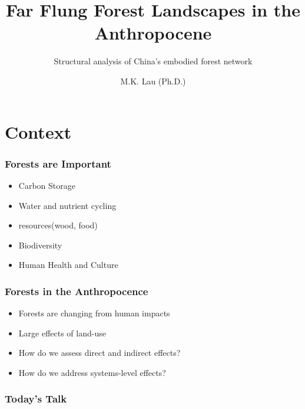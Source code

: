 \documentclass[aspectratio=169]{beamer}
\title{Far Flung Forest Landscapes in the Anthropocene}
\subtitle{Structural analysis of China's embodied forest network}
\author{M.K. Lau (Ph.D.)}
\institute{Chinese Academy of Sciences and Harvard University}
\begin{document}
\begin{frame}
  \titlepage
\end{frame}

\section*{Context}

\begin{frame}
  \frametitle{Forests are Important}

  \begin{itemize}
  \item Carbon Storage
  \item Water and nutrient cycling
  \item resources(wood, food)
  \item Biodiversity
  \item Human Health and Culture
  \end{itemize}

\end{frame}


\begin{frame}
  \frametitle{Forests in the Anthropocence}
  
  \begin{itemize}
  \item Forests are changing from human impacts
  \item Large effects of land-use
  \item How do we assess direct and indirect effects?
  \item How do we address systems-level effects?
  \end{itemize}

\end{frame}


\begin{frame}
  \frametitle{Today's Talk}

\tableofcontents


\end{frame}
\end{document}
